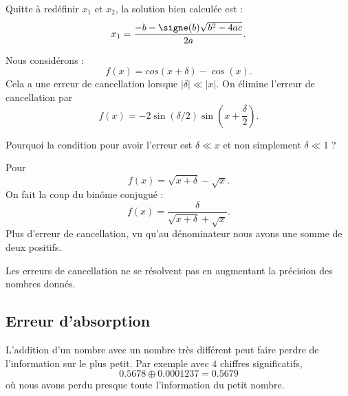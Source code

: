 Quitte à redéfinir \( x_1\) et \( x_2\), la solution bien calculée est :
\begin{equation}
	x_1=\frac{ -b-\signe(b)\sqrt{b^2-4ac} }{ 2a }.
\end{equation}

\begin{example}
	Nous considérons :
	\begin{equation}
		f(x)=cos(x+\delta)-\cos(x).
	\end{equation}
	Cela a une erreur de cancellation lorsque \( | \delta |\ll | x |\). On élimine l'erreur de cancellation par
	\begin{equation}
		f(x)=-2\sin(\delta/2)\sin\left( x+\frac{ \delta }{ 2 } \right).
	\end{equation}

	\begin{probleme}
		Pourquoi la condition pour avoir l'erreur est \( \delta\ll x\) et non simplement \( \delta\ll 1\) ?
	\end{probleme}

\end{example}

\begin{example}
	Pour
	\begin{equation}
		f(x)=\sqrt{x+\delta}-\sqrt{x}.
	\end{equation}
	On fait la coup du binôme conjugué :
	\begin{equation}
		f(x)=\frac{ \delta }{ \sqrt{x+\delta}+\sqrt{x} }.
	\end{equation}
	Plus d'erreur de cancellation, vu qu'au dénominateur nous avons une somme de deux positifs.
\end{example}

Les erreurs de cancellation ne se résolvent pas en augmentant la précision des nombres donnés.

\subsection{Erreur d'absorption}

L'addition d'un nombre avec un nombre très différent peut faire perdre de l'information sur le plus petit. Par exemple avec \( 4\) chiffres significatifs,
\begin{equation}
    0.5678\oplus 0.0001237=0.5679
\end{equation}
où nous avons perdu presque toute l'information du petit nombre.

